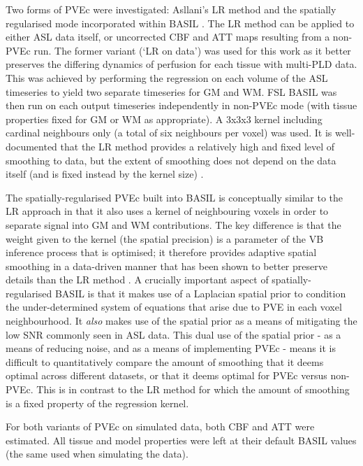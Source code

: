 \documentclass[12pt]{report}
\providecommand{\DIFaddtex}[1]{{\protect\color{blue}\uwave{#1}}} %
\providecommand{\DIFaddbegin}{} %
\providecommand{\DIFaddend}{} %
\providecommand{\DIFadd}[1]{\texorpdfstring{\DIFaddtex{#1}}{#1}} %
\newcommand{\DIFaddincludegraphics}[2][]{{\color{blue}\fbox{\DIFOincludegraphics[#1]{#2}}}} %
\DeclareRobustCommand{\DIFaddbegin}{\DIFOaddbegin \let\includegraphics\DIFaddincludegraphics} %
\DeclareRobustCommand{\DIFaddend}{\DIFOaddend \let\includegraphics\DIFOincludegraphics} %
\begin{document}
Two forms of PVEc were investigated: Asllani's LR method \cite{Asllani2008} and the spatially regularised mode incorporated within BASIL \cite{Chappell2009, Chappell2011}. The LR method can be applied to either ASL data itself, or uncorrected  CBF and ATT maps resulting from a non-PVEc run. The former variant (`LR on data') was used for this work as it better preserves the differing dynamics of perfusion for each tissue with multi-PLD data. This was achieved by performing the regression on each volume of the ASL timeseries to yield two separate timeseries for GM and WM. FSL BASIL was then run on each output timeseries independently in non-PVEc mode (with tissue properties fixed for GM or WM as appropriate). A 3x3x3 kernel including cardinal neighbours only (a total of six neighbours per voxel) was used. It is well-documented that the LR method provides a relatively high and fixed level of smoothing to data, but the extent of smoothing does not depend on the data itself (and is fixed instead by the kernel size) \DIFaddbegin \DIFadd{\mbox{%
\cite{Asllani2008, Zhao2017a}}\hspace{0pt}%
}\DIFaddend . 

The spatially-regularised PVEc built into BASIL is conceptually similar to the LR approach in that it also uses a kernel of neighbouring voxels in order to separate signal into GM and WM contributions. The key difference is that the weight given to the kernel (the spatial precision) is a parameter of the VB inference process that is optimised; it therefore provides adaptive spatial smoothing in a data-driven manner that has been shown to better preserve details than the LR method \cite{Zhao2017a}. A crucially important aspect of spatially-regularised BASIL is that it makes use of a Laplacian spatial prior to condition the under-determined system of equations that arise due to PVE in each voxel neighbourhood. It \textit{also} makes use of the spatial prior as a means of mitigating the low SNR commonly seen in ASL data. This dual use of the spatial prior - as a means of reducing noise, and as a means of implementing PVEc - means it is difficult to quantitatively compare the amount of smoothing that it deems optimal across different datasets, or that it deems optimal for PVEc versus non-PVEc. This is in contrast to the LR method for which the amount of smoothing is a fixed property of the regression kernel.

For both variants of PVEc on simulated data, both CBF and ATT were estimated. All tissue and model properties were left at their default BASIL values (the same used when simulating the data). 
\end{document}
